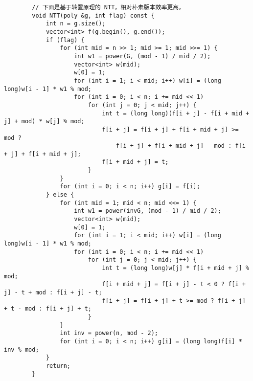 \begin{verbatim}
        // 下面是基于转置原理的 NTT，相对朴素版本效率更高。
        void NTT(poly &g, int flag) const {
            int n = g.size();
            vector<int> f(g.begin(), g.end());
            if (flag) {
                for (int mid = n >> 1; mid >= 1; mid >>= 1) {
                    int w1 = power(G, (mod - 1) / mid / 2);
                    vector<int> w(mid);
                    w[0] = 1;
                    for (int i = 1; i < mid; i++) w[i] = (long long)w[i - 1] * w1 % mod;
                    for (int i = 0; i < n; i += mid << 1)
                        for (int j = 0; j < mid; j++) {
                            int t = (long long)(f[i + j] - f[i + mid + j] + mod) * w[j] % mod;
                            f[i + j] = f[i + j] + f[i + mid + j] >= mod ?
                                f[i + j] + f[i + mid + j] - mod : f[i + j] + f[i + mid + j];
                            f[i + mid + j] = t;
                        }
                }
                for (int i = 0; i < n; i++) g[i] = f[i];
            } else {
                for (int mid = 1; mid < n; mid <<= 1) {
                    int w1 = power(invG, (mod - 1) / mid / 2);
                    vector<int> w(mid);
                    w[0] = 1;
                    for (int i = 1; i < mid; i++) w[i] = (long long)w[i - 1] * w1 % mod;
                    for (int i = 0; i < n; i += mid << 1)
                        for (int j = 0; j < mid; j++) {
                            int t = (long long)w[j] * f[i + mid + j] % mod;
                            f[i + mid + j] = f[i + j] - t < 0 ? f[i + j] - t + mod : f[i + j] - t;
                            f[i + j] = f[i + j] + t >= mod ? f[i + j] + t - mod : f[i + j] + t;
                        }
                }
                int inv = power(n, mod - 2);
                for (int i = 0; i < n; i++) g[i] = (long long)f[i] * inv % mod;
            }
            return;
        }


\end{verbatim}
